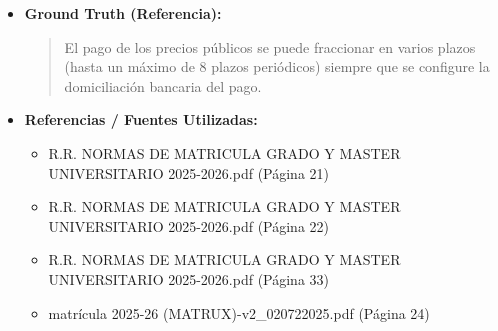 \documentclass[12pt,a4paper,oneside]{report}
\begin{document}
\begin{itemize}
\begin{itemize}
\begin{quote}
\noindent\textbf{Importante}\\
\begin{itemize}
  \item Asegúrate de pagar cada plazo dentro del plazo establecido para evitar la anulación de tu matrícula.
  \item Si tienes alguna duda o problema durante el proceso, no dudes en contactar con la universidad para obtener asistencia.
  \item Recuerda que la \textbf{Orden de Domiciliación de Adeudo Directo SEPA} se generará automáticamente si es necesaria y no has cumplimentado una anteriormente.
\end{itemize}
                \end{quote}
          \item \textbf{{Ground Truth (Referencia):}} \\
                \begin{quote}
El pago de los precios públicos se puede fraccionar en varios plazos (hasta un máximo de 8 plazos periódicos) siempre que se configure la domiciliación bancaria del pago.
                \end{quote}
          \item \textbf{{Referencias / Fuentes Utilizadas:}} \\
                \begin{itemize}
                  \item R.R. NORMAS DE MATRICULA GRADO Y MASTER UNIVERSITARIO 2025-2026.pdf (Página 21)
                  \item R.R. NORMAS DE MATRICULA GRADO Y MASTER UNIVERSITARIO 2025-2026.pdf (Página 22)
                  \item R.R. NORMAS DE MATRICULA GRADO Y MASTER UNIVERSITARIO 2025-2026.pdf (Página 33)
                  \item matrícula 2025-26 (MATRUX)-v2\_020722025.pdf (Página 24)
                \end{itemize}
        \end{itemize}


\end{itemize}
\end{document}
